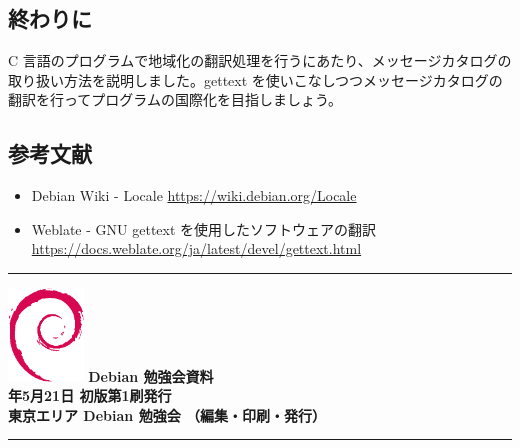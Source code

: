 \documentclass[mingoth,a4paper]{jsarticle}
\newcommand{\debmtgyear}{2022}
\newcommand{\debmtgmonth}{5}
\newcommand{\debmtgdate}{21}
\begin{document}
\subsection{終わりに}

C 言語のプログラムで地域化の翻訳処理を行うにあたり、メッセージカタログの取り扱い方法を説明しました。gettext を使いこなしつつメッセージカタログの翻訳を行ってプログラムの国際化を目指しましょう。

\subsection{参考文献}

\begin{itemize}
\item Debian Wiki - Locale \url{https://wiki.debian.org/Locale}
\item Weblate - GNU gettext を使用したソフトウェアの翻訳 \\ \url{https://docs.weblate.org/ja/latest/devel/gettext.html}
\end{itemize}
      

\vspace*{15cm}
\hrule
\vspace{2mm}
\includegraphics[width=2cm]{image-assets/openlogo-nd.eps}
\noindent \Large \bf Debian 勉強会資料\\
\noindent \normalfont \debmtgyear{}年\debmtgmonth{}月\debmtgdate{}日 \hspace{5mm}  初版第1刷発行\\
\noindent \normalfont 東京エリア Debian 勉強会 （編集・印刷・発行）\\
\hrule
\end{document}
